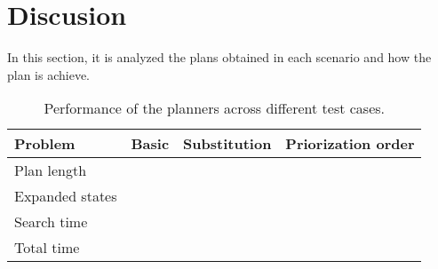 \section{Discusion}
In this section, it is analyzed the plans obtained in each scenario and how the plan is achieve.

\begin{table}[H]
    \begin{tabular}{|l|c|c|c|}
    \hline
    Problem         & Basic & Substitution & Priorization order \\ \hline
    Plan length     &       &              &                    \\ \hline
    Expanded states &       &              &                    \\ \hline
    Search time     &       &              &                    \\ \hline
    Total time      &       &              &                    \\ \hline
    \end{tabular}
    \caption{Performance of the planners across different test cases.}
\end{table}